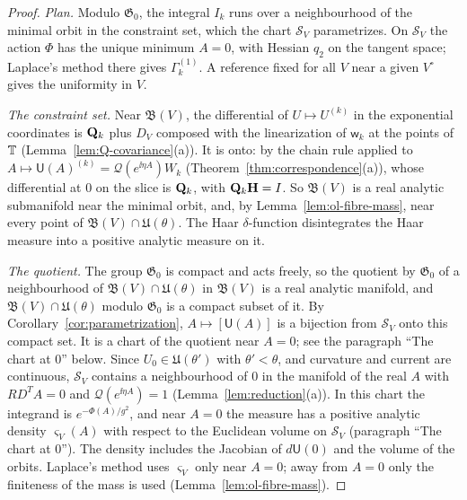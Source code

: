 \begin{proof}
\emph{Plan.} Modulo $\mathfrak G_0$, the integral $I_k$ runs over a neighbourhood of the minimal orbit in the constraint set, which the chart $\mathcal S_V$ parametrizes. On $\mathcal S_V$ the action $\Phi$ has the unique minimum $A=0$, with Hessian $q_2$ on the tangent space; Laplace's method there gives $\Gamma^{(1)}_k$. A reference fixed for all $V$ near a given $V^\circ$ gives the uniformity in $V$.

\emph{The constraint set.} Near $\mathfrak B(V)$, the differential of $U\mapsto U^{(k)}$ in the exponential coordinates is $\mathbf Q_k$ plus $D_V$ composed with the linearization of $\mathsf w_k$ at the points of $\mathbb T$ (Lemma~\ref{lem:Q-covariance}(a)). It is onto: by the chain rule applied to $A\mapsto\mathsf U(A)^{(k)}=\mathcal Q(e^{\ii\eta A})W_k$ (Theorem~\ref{thm:correspondence}(a)), whose differential at $0$ on the slice is $\mathbf Q_k$, with $\mathbf Q_k\mathbf H=I$. So $\mathfrak B(V)$ is a real analytic submanifold near the minimal orbit, and, by Lemma~\ref{lem:ol-fibre-mass}, near every point of $\mathfrak B(V)\cap\mathfrak U(\theta)$. The Haar $\delta$-function disintegrates the Haar measure into a positive analytic measure on it.

\emph{The quotient.} The group $\mathfrak G_0$ is compact and acts freely, so the quotient by $\mathfrak G_0$ of a neighbourhood of $\mathfrak B(V)\cap\mathfrak U(\theta)$ in $\mathfrak B(V)$ is a real analytic manifold, and $\mathfrak B(V)\cap\mathfrak U(\theta)$ modulo $\mathfrak G_0$ is a compact subset of it. By Corollary~\ref{cor:parametrization}, $A\mapsto[\mathsf U(A)]$ is a bijection from $\mathcal S_V$ onto this compact set. It is a chart of the quotient near $A=0$; see the paragraph ``The chart at $0$'' below. Since $U_0\in\mathfrak U(\theta')$ with $\theta'<\theta$, and curvature and current are continuous, $\mathcal S_V$ contains a neighbourhood of $0$ in the manifold of the real $A$ with $RD^TA=0$ and $\mathcal Q(e^{\ii\eta A})=1$ (Lemma~\ref{lem:reduction}(a)). In this chart the integrand is $e^{-\Phi(A)/g^2}$, and near $A=0$ the measure has a positive analytic density $\varsigma_V(A)$ with respect to the Euclidean volume on $\mathcal S_V$ (paragraph ``The chart at $0$''). The density includes the Jacobian of $d\mathsf U(0)$ and the volume of the orbits. Laplace's method uses $\varsigma_V$ only near $A=0$; away from $A=0$ only the finiteness of the mass is used (Lemma~\ref{lem:ol-fibre-mass}).


\end{proof}
